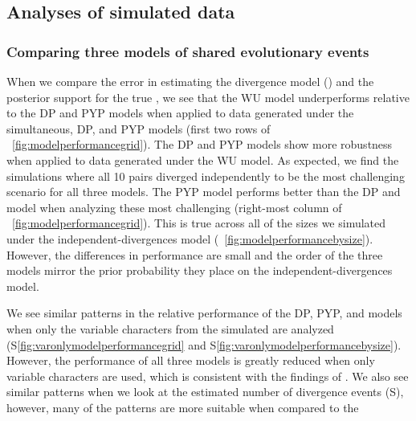 \documentclass[letterpaper,12pt]{article}
\begin{document}
\subsection{Analyses of simulated data}

\subsubsection{Comparing three models of shared evolutionary events}

When we compare the error in estimating the divergence model (\etimesets) and
the posterior support for the true \etimesets, we see that the WU model
underperforms relative to the DP and PYP models when applied to data generated
under the simultaneous, DP, and PYP models
(first two rows of \fig~\ref{fig:modelperformancegrid}).
The DP and PYP models show more robustness when applied to
data generated under the WU model.
As expected, we find the simulations where all 10 pairs diverged independently
to be the most challenging scenario for all three models.
The PYP model performs better than the DP and \wunif model
when analyzing these most challenging \datasets
(right-most column of \fig~\ref{fig:modelperformancegrid}).
This is true across all of the \dataset sizes we simulated
under the independent-divergences model
(\fig~\ref{fig:modelperformancebysize}).
However, the differences in performance are small and the order of the three
models mirror the prior probability they place on the independent-divergences
model.

We see similar patterns in the relative performance of the DP, PYP, and
\wunif models when only the variable characters from the simulated
\datasets are analyzed
(\figs S\ref{fig:varonlymodelperformancegrid}
and S\ref{fig:varonlymodelperformancebysize}).
However, the performance of all three models is greatly reduced when
only variable characters are used,
which is consistent with the findings of
\citet{Oaks2018ecoevolity,Oaks2018paic,Oaks2019codemog}.
We also see similar patterns when we look at the estimated
number of divergence events
(\figs S), however, many of the patterns are more
suitable when compared to the 
\end{document}
